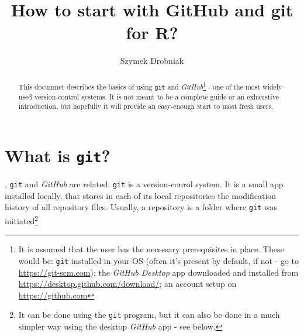 \documentclass{tufte-handout}
\title[How to start with GitHub and git for R?]{How to start with GitHub and git for \textnormal{\textsf{R}}?}
\author[Szymon M. Drobniak]{Szymek Drobniak}
\begin{document}
\maketitle%

\begin{abstract}
\noindent This documnet describes the basics of using \texttt{git} and \textit{GitHub}\footnote{It is assumed that the user has the necessary prerequisites in place. These would be: \texttt{git} installed in your OS (often it's present by default, if not - go to \url{https://git-scm.com}); the \textit{GitHub Desktop} app downloaded and installed from \url{https://desktop.github.com/download/}; an account setup on \url{https://github.com}} - one of the most widely used version-control systems. It is not meant to be a complete guide or an exhaustive introduction, but hopefully it will provide an easy-enough start to most fresh users.
\end{abstract}


\section[What is git?]{What is \textnormal{\texttt{git}}?}\label{sec:what-git}

, \texttt{git} and \textit{GitHub} are related. \texttt{git} is a version-conrol system. It is a small app installed locally, that stores in each of its local repositories the modification history of all repository files. Usually, a repository is a folder where \texttt{git} was initiated\footnote{It can be done using the \texttt{git} program, but it can also be done in a much simpler way using the desktop \textit{GitHub} app - see below.}
\end{document}
